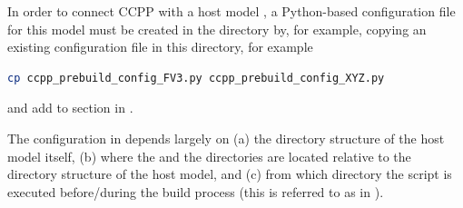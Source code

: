 In order to connect CCPP with a host model , a Python-based configuration file for this model must be created in the directory  by, for example, copying an existing configuration file in this directory, for example
\begin{lstlisting}[language=bash]
cp ccpp_prebuild_config_FV3.py ccpp_prebuild_config_XYZ.py
\end{lstlisting}
and add  to section  in .

The configuration in  depends largely on (a) the directory structure of the host model itself, (b) where the  and the  directories are located relative to the directory structure of the host model, and (c) from which directory the  script is executed before/during the build process (this is referred to as  in ).

